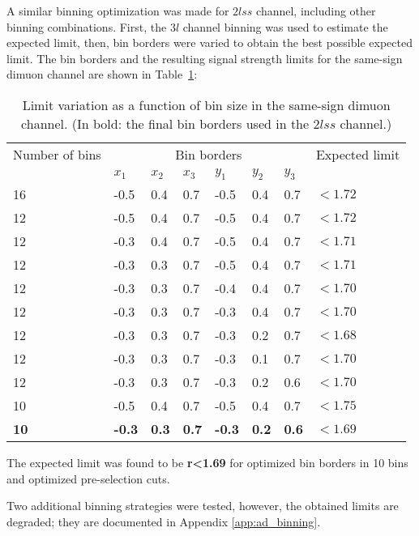 A similar binning optimization was made for $2lss$ channel, including other binning combinations. First, the $3l$ channel binning was used to estimate the expected limit, then, bin borders were varied to obtain the best possible expected limit. The bin borders and the resulting signal strength limits for the same-sign dimuon channel are shown in Table~\ref{bin_limits_2lss}:

\begin{table}[h!]
\centering
\begin{tabular}{llllllll}\hline
Number of bins  & \multicolumn{6}{c}{Bin borders}  & Expected limit \\
                &$x_1$&$x_2$&$x_3$&$y_1$&$y_2$&$y_3$&\\\hline
16              &-0.5 & 0.4 & 0.7 &-0.5 & 0.4 & 0.7 & $<1.72$\\
12              &-0.5 & 0.4 & 0.7 &-0.5 & 0.4 & 0.7 & $<1.72$\\
12              &-0.3 & 0.4 & 0.7 &-0.5 & 0.4 & 0.7 & $<1.71$\\
12              &-0.3 & 0.3 & 0.7 &-0.5 & 0.4 & 0.7 & $<1.71$\\
12              &-0.3 & 0.3 & 0.7 &-0.4 & 0.4 & 0.7 & $<1.70$\\
12              &-0.3 & 0.3 & 0.7 &-0.3 & 0.4 & 0.7 & $<1.70$\\
12              &-0.3 & 0.3 & 0.7 &-0.3 & 0.2 & 0.7 & $<1.68$\\
12              &-0.3 & 0.3 & 0.7 &-0.3 & 0.1 & 0.7 & $<1.70$\\
12              &-0.3 & 0.3 & 0.7 &-0.3 & 0.2 & 0.6 & $<1.70$\\
10              &-0.5 & 0.4 & 0.7 &-0.5 & 0.4 & 0.7 & $<1.75$\\
\textbf{10}     &\textbf{-0.3} &\textbf{ 0.3} &\textbf{ 0.7} &\textbf{-0.3} &\textbf{ 0.2} &\textbf{ 0.6} &$\mathbf{<1.69}$\\\hline
\end{tabular}
\caption{Limit variation as a function of bin size in the same-sign dimuon channel. (In bold: the final bin borders used in the $2lss$ channel.)}
\label{bin_limits_2lss}
\end{table}

The expected limit was found to be \textbf{r<1.69} for optimized bin borders in 10 bins and optimized pre-selection cuts.

Two additional binning strategies were tested, however, the obtained limits are degraded; they are documented in Appendix \ref{app:ad_binning}.   


